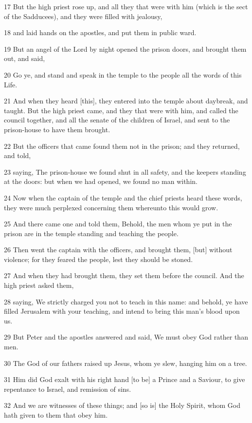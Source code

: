 \par 17 But the high priest rose up, and all they that were with him (which is the sect of the Sadducees), and they were filled with jealousy,
\par 18 and laid hands on the apostles, and put them in public ward.
\par 19 But an angel of the Lord by night opened the prison doors, and brought them out, and said,
\par 20 Go ye, and stand and speak in the temple to the people all the words of this Life.
\par 21 And when they heard [this], they entered into the temple about daybreak, and taught. But the high priest came, and they that were with him, and called the council together, and all the senate of the children of Israel, and sent to the prison-house to have them brought.
\par 22 But the officers that came found them not in the prison; and they returned, and told,
\par 23 saying, The prison-house we found shut in all safety, and the keepers standing at the doors: but when we had opened, we found no man within.
\par 24 Now when the captain of the temple and the chief priests heard these words, they were much perplexed concerning them whereunto this would grow.
\par 25 And there came one and told them, Behold, the men whom ye put in the prison are in the temple standing and teaching the people.
\par 26 Then went the captain with the officers, and brought them, [but] without violence; for they feared the people, lest they should be stoned.
\par 27 And when they had brought them, they set them before the council. And the high priest asked them,
\par 28 saying, We strictly charged you not to teach in this name: and behold, ye have filled Jerusalem with your teaching, and intend to bring this man's blood upon us.
\par 29 But Peter and the apostles answered and said, We must obey God rather than men.
\par 30 The God of our fathers raised up Jesus, whom ye slew, hanging him on a tree.
\par 31 Him did God exalt with his right hand [to be] a Prince and a Saviour, to give repentance to Israel, and remission of sins.
\par 32 And we are witnesses of these things; and [so is] the Holy Spirit, whom God hath given to them that obey him.
